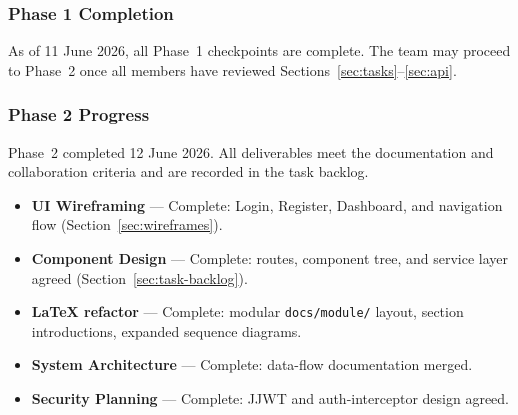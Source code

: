 \subsubsection{Phase 1 Completion}
As of 11 June 2026, all Phase~1 checkpoints are complete. The team may proceed to Phase~2 once all
members have reviewed Sections~\ref{sec:tasks}--\ref{sec:api}.

\subsubsection{Phase 2 Progress}
Phase~2 completed 12 June 2026. All deliverables meet the documentation and collaboration criteria
and are recorded in the task backlog.
\begin{itemize}
  \item \textbf{UI Wireframing} --- Complete: Login, Register, Dashboard, and navigation flow (Section~\ref{sec:wireframes}).
  \item \textbf{Component Design} --- Complete: routes, component tree, and service layer agreed (Section~\ref{sec:task-backlog}).
  \item \textbf{LaTeX refactor} --- Complete: modular \texttt{docs/module/} layout, section introductions, expanded sequence diagrams.
  \item \textbf{System Architecture} --- Complete: data-flow documentation merged.
  \item \textbf{Security Planning} --- Complete: JJWT and auth-interceptor design agreed.
\end{itemize}

